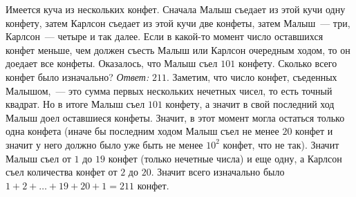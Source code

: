 \problem
Имеется куча из нескольких конфет.
Сначала Малыш съедает из этой кучи одну конфету, затем Карлсон съедает из этой
кучи две конфеты, затем Малыш~--- три, Карлсон~--- четыре и так далее.
Если в какой-то момент число оставшихся конфет меньше, чем должен съесть Малыш
или Карлсон очередным ходом, то он доедает все конфеты.
Оказалось, что Малыш съел $101$ конфету.
Сколько всего конфет было изначально?
\solution
\emph{Ответ:} $211$.
Заметим, что число конфет, съеденных Малышом,~--- это сумма первых нескольких
нечетных чисел, то есть точный квадрат.
Но в итоге Малыш съел $101$ конфету, а значит в свой последний ход Малыш доел
оставшиеся конфеты.
Значит, в этот момент могла остаться только одна конфета
(иначе бы последним ходом Малыш съел не менее $20$ конфет и значит у него
должно было уже быть не менее $10^2$ конфет, что не так).
Значит Малыш съел от $1$ до $19$ конфет (только нечетные числа) и еще одну, а
Карлсон съел количества конфет от $2$ до $20$.
Значит всего изначально было $1 + 2 + \ldots + 19 + 20 + 1 = 211$ конфет.
\endproblem
